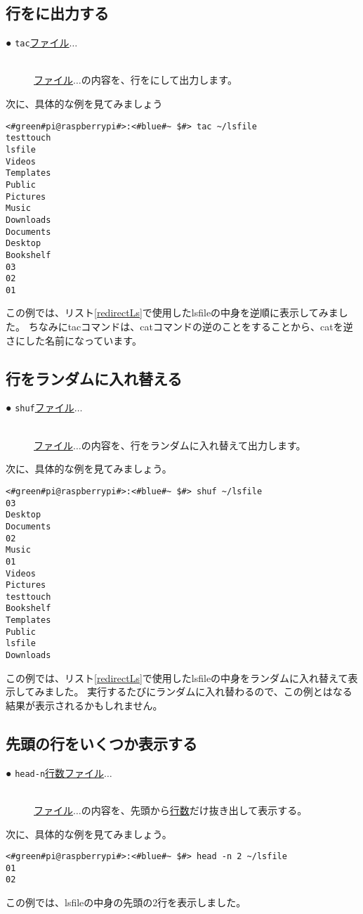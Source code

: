 \subsection{行をに出力する}
\begin{description}
    \item[● \texttt{tac}\textvisiblespace \underline{ファイル}$\ldots$]\mbox{}\\
    \underline{ファイル}$\ldots$の内容を、行をにして出力します。
\end{description}
次に、具体的な例を見てみましょう
\begin{lstlisting}[caption=tacコマンドの実行例, label=tac_example]
<#green#pi@raspberrypi#>:<#blue#~ $#> tac ~/lsfile
testtouch
lsfile
Videos
Templates
Public
Pictures
Music
Downloads
Documents
Desktop
Bookshelf
03
02
01 
\end{lstlisting}
この例では、リスト\ref{redirectLs}で使用したlsfileの中身を逆順に表示してみました。
ちなみにtacコマンドは、catコマンドの逆のことをすることから、catを逆さにした名前になっています。


\subsection{行をランダムに入れ替える}
\begin{description}
    \item[● \texttt{shuf}\textvisiblespace \underline{ファイル}$\ldots$]\mbox{}\\
    \underline{ファイル}$\ldots$の内容を、行をランダムに入れ替えて出力します。
\end{description}
次に、具体的な例を見てみましょう。
\begin{lstlisting}[caption=shufコマンドの実行例, label=shuf_example]
<#green#pi@raspberrypi#>:<#blue#~ $#> shuf ~/lsfile
03
Desktop
Documents
02
Music
01
Videos
Pictures
testtouch
Bookshelf
Templates
Public
lsfile
Downloads
\end{lstlisting}
この例では、リスト\ref{redirectLs}で使用したlsfileの中身をランダムに入れ替えて表示してみました。
実行するたびにランダムに入れ替わるので、この例とはなる結果が表示されるかもしれません。

\subsection{先頭の行をいくつか表示する}
\begin{description}
    \item[● \texttt{head}\textvisiblespace \texttt{-n}\textvisiblespace \underline{行数}\textvisiblespace \underline{ファイル}$\ldots$ ]\mbox{}\\
    \underline{ファイル}$\ldots$の内容を、先頭から\underline{行数}だけ抜き出して表示する。
\end{description}
次に、具体的な例を見てみましょう。
\begin{lstlisting}[caption=headコマンドの実行例, label=shuf_example]
<#green#pi@raspberrypi#>:<#blue#~ $#> head -n 2 ~/lsfile
01
02
\end{lstlisting}
この例では、lsfileの中身の先頭の2行を表示しました。

